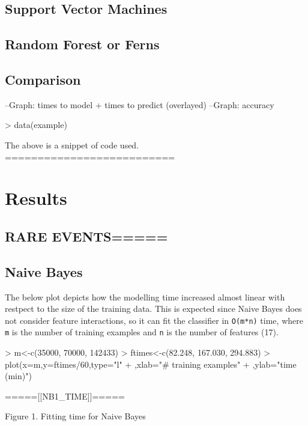 \documentclass[a4paper]{article}
\begin{document}
\begin{multicols}{2}
\subsection*{Support Vector Machines}

\subsection*{Random Forest or Ferns}

\subsection*{Comparison}
--Graph: times to model + times to predict (overlayed)
--Graph: accuracy

\begin{Schunk}
\begin{Sinput}
> data(example)
\end{Sinput}
\end{Schunk}
The above is a snippet of code used. 
==========================


\section*{Results}

\subsection*{RARE EVENTS=====}

\subsection*{Naive Bayes}
The below plot depicts how the modelling time increased almost linear with restpect to the size of the training data. This is expected since Naive Bayes does not consider feature interactions, so it can fit the classifier in \texttt{O(m*n)} time, where \texttt{m} is the number of training examples and \texttt{n} is the number of features (17).
\begin{Schunk}
\begin{Sinput}
> m<-c(35000, 70000, 142433)
> ftimes<-c(82.248, 167.030, 294.883)
> plot(x=m,y=ftimes/60,type="l"
+      ,xlab="# training examples"
+      ,ylab="time (min)")
\end{Sinput}
\end{Schunk}
\begin{center}
=====[[NB1\_TIME]]=====

Figure 1. Fitting time for Naive Bayes
\end{center}


\end{multicols}
\end{document}
